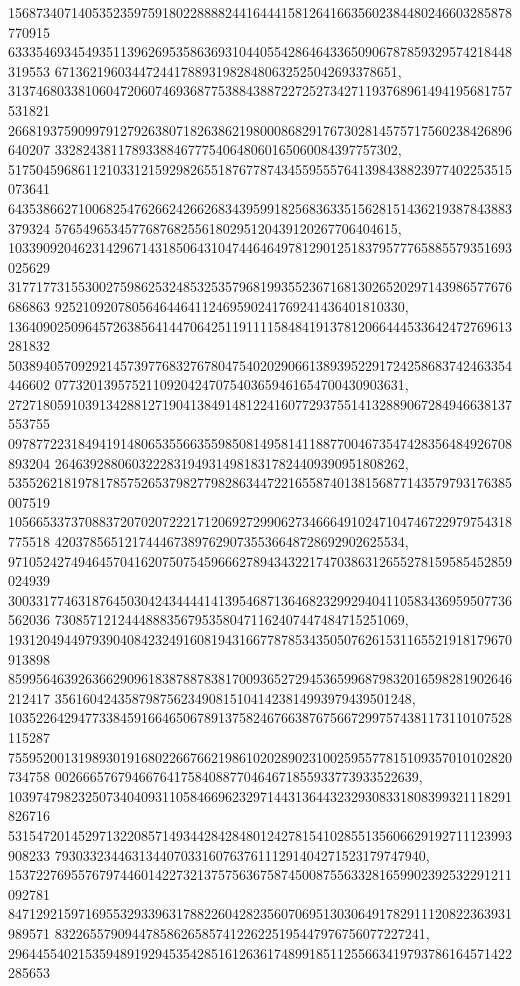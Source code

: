 \documentclass[12pt]{article}
\begin{document}
156873407140535235975918022888824416444158126416635602384480246603285878770915
633354693454935113962695358636931044055428646433650906787859329574218448319553
6713621960344724417889319828480632525042693378651, 
313746803381060472060746936877538843887227252734271193768961494195681757531821
266819375909979127926380718263862198000868291767302814575717560238426896640207
3328243811789338846777540648060165060084397757302, 
517504596861121033121592982655187677874345595557641398438823977402253515073641
643538662710068254762662426626834395991825683633515628151436219387843883379324
5765496534577687682556180295120439120267706404615, 
103390920462314296714318506431047446464978129012518379577765885579351693025629
317717731553002759862532485325357968199355236716813026520297143986577676686863
92521092078056464464112469590241769241436401810330, 
136409025096457263856414470642511911115848419137812066444533642472769613281832
503894057092921457397768327678047540202906613893952291724258683742463354446602
07732013957521109204247075403659461654700430903631, 
272718059103913428812719041384914812241607729375514132889067284946638137553755
097877223184941914806535566355985081495814118877004673547428356484926708893204
26463928806032228319493149818317824409390951808262, 
535526218197817857526537982779828634472216558740138156877143579793176385007519
105665337370883720702072221712069272990627346664910247104746722979754318775518
42037856512174446738976290735536648728692902625534, 
971052427494645704162075075459666278943432217470386312655278159585452859024939
300331774631876450304243444414139546871364682329929404110583436959507736562036
73085712124448883567953580471162407447484715251069, 
193120494497939040842324916081943166778785343505076261531165521918179670913898
859956463926366290961838788783817009365272945365996879832016598281902646212417
356160424358798756234908151041423814993979439501248, 
103522642947733845916646506789137582467663876756672997574381173110107528115287
755952001319893019168022667662198610202890231002595577815109357010102820734758
0026665767946676417584088770464671855933773933522639, 
103974798232507340409311058466962329714431364432329308331808399321118291826716
531547201452971322085714934428428480124278154102855135606629192711123993908233
79303323446313440703316076376111291404271523179747940, 
153722769557679744601422732137575636758745008755633281659902392532291211092781
847129215971695532933963178822604282356070695130306491782911120822363931989571
83226557909447858626585741226225195447976756077227241, 
296445540215359489192945354285161263617489918511255663419793786164571422285653
\end{document}
